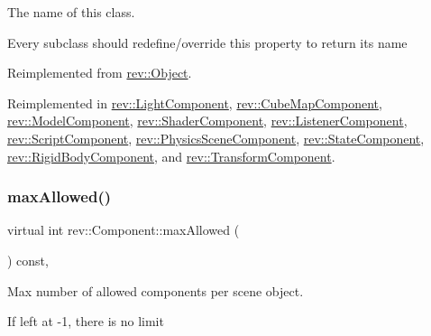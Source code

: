 The name of this class. 

Every subclass should redefine/override this property to return its name 

Reimplemented from \mbox{\hyperlink{classrev_1_1_object_a7a2013f91169479b65cf93afdc5d9a68}{rev\+::\+Object}}.



Reimplemented in \mbox{\hyperlink{classrev_1_1_light_component_a627371d0bebc32f2eb91e6e5b95f81d0}{rev\+::\+Light\+Component}}, \mbox{\hyperlink{classrev_1_1_cube_map_component_a09be93995cb43696c7f7644a224b59e4}{rev\+::\+Cube\+Map\+Component}}, \mbox{\hyperlink{classrev_1_1_model_component_a31298d9d0fb5d7e43cbe6de3050d4f6a}{rev\+::\+Model\+Component}}, \mbox{\hyperlink{classrev_1_1_shader_component_a62ddc1d5981e4952890a628ca5b6d12a}{rev\+::\+Shader\+Component}}, \mbox{\hyperlink{classrev_1_1_listener_component_ab25dc63421b42bf388e9b1e57e635661}{rev\+::\+Listener\+Component}}, \mbox{\hyperlink{classrev_1_1_script_component_a2665164dc38caad07e5759aec4563dee}{rev\+::\+Script\+Component}}, \mbox{\hyperlink{classrev_1_1_physics_scene_component_a03e184a92a2fb3ed39f730e51c347cd4}{rev\+::\+Physics\+Scene\+Component}}, \mbox{\hyperlink{classrev_1_1_state_component_a1f24f3bb3f13a85784d866fb9caaeabc}{rev\+::\+State\+Component}}, \mbox{\hyperlink{classrev_1_1_rigid_body_component_aac4681f78e6e53a6fceae27502b08bc5}{rev\+::\+Rigid\+Body\+Component}}, and \mbox{\hyperlink{classrev_1_1_transform_component_a04a11c6b0b9f124c53a84226a488a1e9}{rev\+::\+Transform\+Component}}.

\mbox{\label{classrev_1_1_component_afb80a97b6b36368c88a47e5f3cd3ed2f}} 
\subsubsection{\texorpdfstring{maxAllowed()}{maxAllowed()}}
{\footnotesize\ttfamily virtual int rev\+::\+Component\+::max\+Allowed (\begin{DoxyParamCaption}{ }\end{DoxyParamCaption}) const\hspace{0.3cm}{\ttfamily [inline]}, {\ttfamily [virtual]}}



Max number of allowed components per scene object. 

If left at -\/1, there is no limit 

